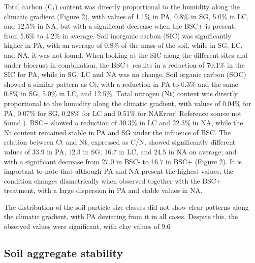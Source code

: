 {Total carbon (C$_t$) content was directly proportional to the humidity along the climatic gradient (Figure 2), with values of 1.1\% in PA, 0.8\% in SG, 5.0\% in LC, and 12.5\% in NA, but with a significant decrease when the BSC+ is present, from 5.6\% to 4.2\% in average. Soil inorganic carbon (SIC) was significantly higher in PA, with an average of 0.8\% of the mass of the soil, while in SG, LC, and NA, it was not found. When looking at the SIC along the different sites and under biocrust in combination, the BSC+ results in a reduction of 70.1\% in the SIC for PA, while in SG, LC and NA was no change. Soil organic carbon (SOC) showed a similar pattern as Ct, with a reduction in PA to 0.3\% and the same 0.8\% in SG, 5.0\% in LC, and 12.5\%. Total nitrogen (Nt) content was directly proportional to the humidity along the climatic gradient, with values of 0.04\% for PA, 0.07\% for SG, 0.28\% for LC and 0.51\% for NAError! Reference source not found.). BSC+ showed a reduction of 30.3\% in LC and 22.3\% in NA, while the Nt content remained stable in PA and SG under the influence of BSC. The relation between Ct and Nt, expressed as C/N, showed significantly different values of 33.9 in PA, 12.3 in SG, 16.7 in LC, and 24.5 in NA on average; and with a significant decrease from 27.0 in BSC- to 16.7 in BSC+ (Figure 2). It is important to note that although PA and NA present the highest values, the condition changes diametrically when observed together with the BSC+ treatment, with a large dispersion in PA and stable values in NA.

The distribution of the soil particle size classes did not show clear patterns along the climatic gradient, with PA deviating from it in all cases. Despite this, the observed values were significant, with clay values of 9.6%

\subsection{Soil aggregate stability}

}
